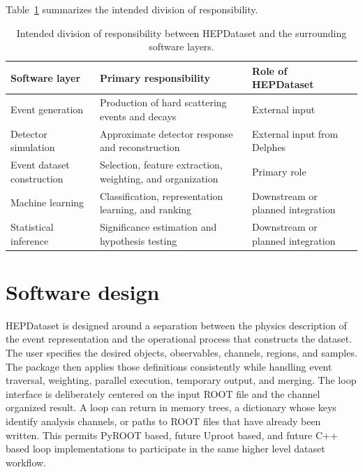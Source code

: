 \documentclass[11pt,a4paper]{article}
\begin{document}
Table~\ref{tab:layers} summarizes the intended division of responsibility.

\begin{table}[htbp]
\centering
\small
\begin{tabular}{@{}>{\raggedright\arraybackslash}p{3.8cm}
                >{\raggedright\arraybackslash}p{6.7cm}
                >{\raggedright\arraybackslash}p{4.2cm}@{}}
\toprule
\textbf{Software layer} & \textbf{Primary responsibility} & \textbf{Role of HEPDataset}\\
\midrule
Event generation       & Production of hard scattering events and decays            & External input\\
Detector simulation    & Approximate detector response and reconstruction           & External input from Delphes\\
Event dataset construction & Selection, feature extraction, weighting, and organization & Primary role\\
Machine learning       & Classification, representation learning, and ranking       & Downstream or planned integration\\
Statistical inference  & Significance estimation and hypothesis testing             & Downstream or planned integration\\
\bottomrule
\end{tabular}
\caption{Intended division of responsibility between HEPDataset and the
surrounding software layers.}
\label{tab:layers}
\end{table}

\section{Software design}

HEPDataset is designed around a separation between the physics description of
the event representation and the operational process that constructs the
dataset. The user specifies the desired objects, observables, channels, regions,
and samples. The package then applies those definitions consistently while
handling event traversal, weighting, parallel execution, temporary output, and
merging. The loop interface is deliberately centered on the input ROOT file and
the channel organized result. A loop can return in memory trees, a dictionary
whose keys identify analysis channels, or paths to ROOT files that have already
been written. This permits PyROOT based, future Uproot based, and future C++
based loop implementations to participate in the same higher level dataset
workflow.
\end{document}
